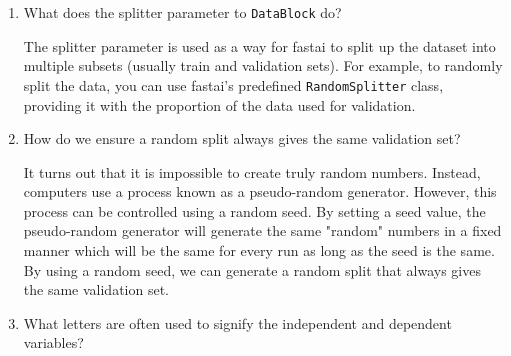 \documentclass[12pt,a4paper]{article}
\begin{document}
\begin{enumerate}
\item What does the splitter parameter to \verb/DataBlock/ do? \\

\smallbreak

The splitter parameter is used as a way for fastai to split up the dataset into multiple subsets (usually train and validation sets). For example, to randomly split the data, you can use fastai's predefined \verb/RandomSplitter/ class, providing it with the proportion of the data used for validation.

\bigbreak

\item How do we ensure a random split always gives the same validation set? \\

\smallbreak

It turns out that it is impossible to create truly random numbers. Instead, computers use a process known as a pseudo-random generator. However, this process can be controlled using a random seed. By setting a seed value, the pseudo-random generator will generate the same "random" numbers in a fixed manner which will be the same for every run as long as the seed is the same. By using a random seed, we can generate a random split that always gives the same validation set.

\bigbreak

\item What letters are often used to signify the independent and dependent variables? \\

\smallbreak



\end{enumerate}
\end{document}
